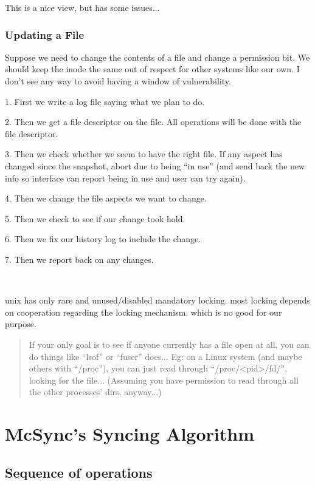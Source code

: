 \documentclass{book}
\begin{document}
This is a nice view, but has some issues...




\subsection{Updating a File}

Suppose we need to change the contents of a file and change a permission bit.
We should keep the inode the same out of respect for other systems like our own.
I don't see any way to avoid having a window of vulnerability.

1. First we write a log file saying what we plan to do.

2. Then we get a file descriptor on the file.  All operations will be done with the file descriptor.

3. Then we check whether we seem to have the right file.  If any aspect has changed since the snapshot, abort due to being ``in use'' (and send back the new info so interface can report being in use and user can try again).

4. Then we change the file aspects we want to change.

5. Then we check to see if our change took hold.

6. Then we fix our history log to include the change.

7. Then we report back on any changes.

~

unix has only rare and unused/disabled mandatory locking.  most locking depends on cooperation regarding the locking mechanism.  which is no good for our purpose.

\begin{quote}
If your only goal is to see if anyone currently has a file open at all, you can do things
like ``lsof'' or ``fuser'' does... Eg: on a Linux system (and maybe others with ``/proc''),
you can just read through ``/proc/<pid>/fd/'', looking for the file... (Assuming you have
permission to read through all the other processes' dirs, anyway...)
\end{quote}





\chapter{McSync's Syncing Algorithm}\label{chap:algo}


\section{Sequence of operations}
\end{document}
